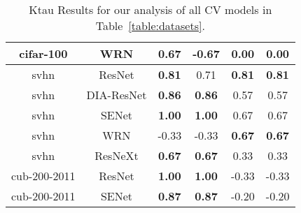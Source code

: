 \begin{table}[t]
\begin{center}
\begin{tabular}{|c|c|c|c|c|c|}
cifar-100 & WRN  & \textbf{0.67} & -0.67 & 0.00 & 0.00 \\
\hline
svhn & ResNet  & \textbf{0.81} & 0.71 & \textbf{0.81} & \textbf{0.81} \\
svhn & DIA-ResNet  & \textbf{0.86} & \textbf{0.86} & 0.57 & 0.57 \\
svhn & SENet  & \textbf{1.00} & \textbf{1.00} & 0.67 & 0.67 \\
svhn & WRN  & -0.33 & -0.33 & \textbf{0.67} & \textbf{0.67} \\
svhn & ResNeXt  & \textbf{0.67} & \textbf{0.67} & 0.33 & 0.33 \\
\hline
cub-200-2011 & ResNet  & \textbf{1.00} & \textbf{1.00} & -0.33 & -0.33 \\
cub-200-2011 & SENet  & \textbf{0.87} & \textbf{0.87} & -0.20 & -0.20 \\

\hline
\end{tabular}
\vspace{-5mm}
\end{center}
\caption{Ktau Results for our analysis of all CV models in Table~\ref{table:datasets}. }
\label{table:Ktauresults}
\end{table}

